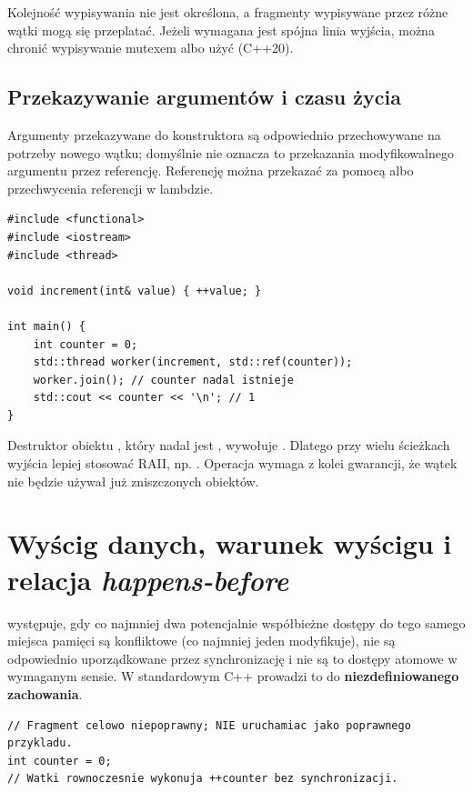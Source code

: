 Kolejność wypisywania nie jest określona, a fragmenty wypisywane przez
różne wątki mogą się przeplatać. Jeżeli wymagana jest spójna linia wyjścia,
można chronić wypisywanie mutexem albo użyć  (C++20).

\subsection{Przekazywanie argumentów i czasu życia}

Argumenty przekazywane do konstruktora  są odpowiednio
przechowywane na potrzeby nowego wątku; domyślnie nie oznacza to przekazania
modyfikowalnego argumentu przez referencję. Referencję można przekazać
za pomocą  albo przechwycenia referencji w lambdzie.

\begin{lstlisting}[caption={Bezpieczne przekazanie referencji z zachowaniem jej czasu życia.}]
#include <functional>
#include <iostream>
#include <thread>

void increment(int& value) { ++value; }

int main() {
    int counter = 0;
    std::thread worker(increment, std::ref(counter));
    worker.join(); // counter nadal istnieje
    std::cout << counter << '\n'; // 1
}
\end{lstlisting}

Destruktor obiektu , który nadal jest
, wywołuje .
Dlatego przy wielu ścieżkach wyjścia lepiej stosować RAII,
np. . Operacja  wymaga z kolei
gwarancji, że wątek nie będzie używał już zniszczonych obiektów.

\section{Wyścig danych, warunek wyścigu i relacja \emph{happens-before}}
\label{sec:race}

 występuje, gdy co najmniej dwa
potencjalnie współbieżne dostępy do tego samego miejsca pamięci są konfliktowe
(co najmniej jeden modyfikuje), nie są odpowiednio uporządkowane przez
synchronizację i nie są to dostępy atomowe w wymaganym sensie. W standardowym
C++ prowadzi to do \textbf{niezdefiniowanego zachowania}.

\begin{lstlisting}[caption={Błędny przykład: niezdefiniowane zachowanie.}]
// Fragment celowo niepoprawny; NIE uruchamiac jako poprawnego przykladu.
int counter = 0;
// Watki rownoczesnie wykonuja ++counter bez synchronizacji.
\end{lstlisting}


